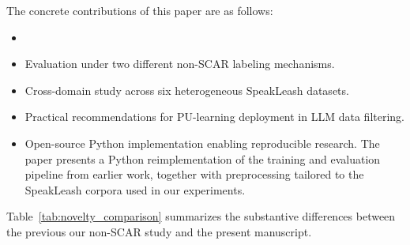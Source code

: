 \documentclass[applsci,article,accept,pdftex,moreauthors]{Definitions/mdpi}
\newcommand{\rev}[1]{{#1}}
\begin{document}
\rev{The concrete contributions of this paper are as follows:}
\begin{itemize}
\item {}
\item \rev{Evaluation under two different non-SCAR labeling mechanisms.}
\item \rev{Cross-domain study across six heterogeneous SpeakLeash datasets.}
\item \rev{Practical recommendations for PU-learning deployment in LLM data filtering.}
\item \rev{Open-source Python implementation enabling reproducible research. The paper presents a Python reimplementation of the training and evaluation pipeline from earlier work, together with preprocessing tailored to the SpeakLeash corpora used in our experiments. }
\end{itemize}

\rev{Table~\ref{tab:novelty_comparison} summarizes the substantive differences between the previous our non-SCAR study and the present manuscript.}
\end{document}
